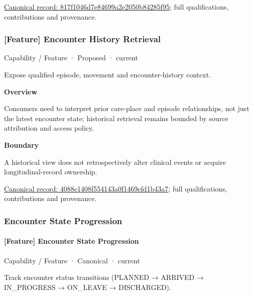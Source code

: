 {\footnotesize \href{../../../../continuum/strategy/capability/feature/817f1046d7e84699a2e2050b84285f95.md}{Canonical record: 817f1046d7e84699a2e2050b84285f95}; full qualifications, contributions and provenance.}\par
\subsubsection{[Feature] Encounter History Retrieval}

\label{element:4088e1408f554143a0f1469efd1b43a7}
{\small Capability / Feature · Proposed · current}\par

Expose qualified episode, movement and encounter-history context.



\textbf{Overview}



Consumers need to interpret prior care-place and episode relationships, not just the latest encounter state; historical retrieval remains bounded by source attribution and access policy.



\textbf{Boundary}



A historical view does not retrospectively alter clinical events or acquire longitudinal-record ownership.


{\footnotesize \href{../../../../continuum/strategy/capability/feature/4088e1408f554143a0f1469efd1b43a7.md}{Canonical record: 4088e1408f554143a0f1469efd1b43a7}; full qualifications, contributions and provenance.}\par
\subsubsection{Encounter State Progression}

\paragraph{[Feature] Encounter State Progression}

\label{element:c049039bf57e4e4aa97aab5967196383}
{\small Capability / Feature · Canonical · current}\par

Track encounter status transitions (PLANNED → ARRIVED → IN\_PROGRESS → ON\_LEAVE → DISCHARGED).



